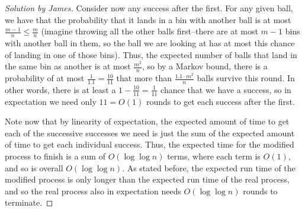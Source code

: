 \documentclass{article}
\newenvironment{solution}[1]{\begin{proof}[Solution by #1]}{\end{proof}}
\begin{document}
\begin{solution}{James}
    Consider now any success after the first.  For any given ball, we have that the probability that it lands in a bin with another ball is at most $\frac{m - 1}{n} \leq \frac{m}{n}$ (imagine throwing all the other balls first--there are at most $m - 1$ bins with another ball in them, so the ball we are looking at has at most this chance of landing in one of those bins).  Thus, the expected number of balls that land in the same bin as another is at most $\frac{m^2}{n}$, so by a Markov bound, there is a probability of at most $\frac{1}{1.1} = \frac{10}{11}$ that more than $\frac{1.1 \cdot m^2}{n}$ balls survive this round.  In other words, there is at least a $1 - \frac{10}{11} = \frac{1}{11}$ chance that we have a success, so in expectation we need only $11 = O(1)$ rounds to get each success after the first.
    
    Note now that by linearity of expectation, the expected amount of time to get each of the successive successes we need is just the sum of the expected amount of time to get each individual success.  Thus, the expected time for the modified process to finish is a sum of $O(\log \log n)$ terms, where each term is $O(1)$, and so is overall $O(\log \log n)$.  As stated before, the expected run time of the modified process is only longer than the expected run time of the real process, and so the real process also in expectation needs $O(\log \log n)$ rounds to terminate.
\end{solution}
\end{document}
